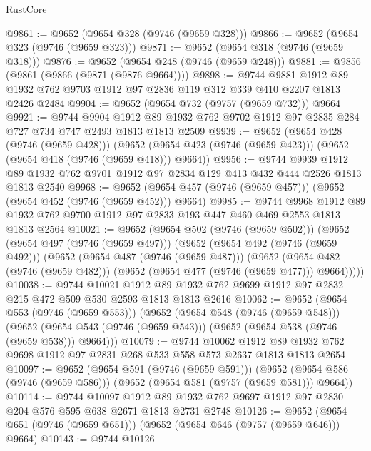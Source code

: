\begin{lexlean}{RustCore}
\begin{coremodule}
@9861 := @9652 (@9654 @328 (@9746 (@9659 @328)))
@9866 := @9652 (@9654 @323 (@9746 (@9659 @323)))
@9871 := @9652 (@9654 @318 (@9746 (@9659 @318)))
@9876 := @9652 (@9654 @248 (@9746 (@9659 @248)))
@9881 := @9856 (@9861 (@9866 (@9871 (@9876 @9664))))
@9898 := @9744
    @9881
    @1912
    @89
    @1932
    @762
    @9703
    @1912
    @97
    @2836
    @119
    @312
    @339
    @410
    @2207
    @1813
    @2426
    @2484
@9904 := @9652 (@9654 @732 (@9757 (@9659 @732))) @9664
@9921 := @9744
    @9904
    @1912
    @89
    @1932
    @762
    @9702
    @1912
    @97
    @2835
    @284
    @727
    @734
    @747
    @2493
    @1813
    @1813
    @2509
@9939 := @9652
    (@9654 @428 (@9746 (@9659 @428)))
    (@9652 (@9654 @423 (@9746 (@9659 @423))) (@9652 (@9654 @418 (@9746 (@9659 @418))) @9664))
@9956 := @9744
    @9939
    @1912
    @89
    @1932
    @762
    @9701
    @1912
    @97
    @2834
    @129
    @413
    @432
    @444
    @2526
    @1813
    @1813
    @2540
@9968 := @9652 (@9654 @457 (@9746 (@9659 @457))) (@9652 (@9654 @452 (@9746 (@9659 @452))) @9664)
@9985 := @9744
    @9968
    @1912
    @89
    @1932
    @762
    @9700
    @1912
    @97
    @2833
    @193
    @447
    @460
    @469
    @2553
    @1813
    @1813
    @2564
@10021 := @9652
    (@9654 @502 (@9746 (@9659 @502)))
    (@9652
      (@9654 @497 (@9746 (@9659 @497)))
      (@9652
        (@9654 @492 (@9746 (@9659 @492)))
        (@9652
          (@9654 @487 (@9746 (@9659 @487)))
          (@9652
            (@9654 @482 (@9746 (@9659 @482)))
            (@9652 (@9654 @477 (@9746 (@9659 @477))) @9664)))))
@10038 := @9744
    @10021
    @1912
    @89
    @1932
    @762
    @9699
    @1912
    @97
    @2832
    @215
    @472
    @509
    @530
    @2593
    @1813
    @1813
    @2616
@10062 := @9652
    (@9654 @553 (@9746 (@9659 @553)))
    (@9652
      (@9654 @548 (@9746 (@9659 @548)))
      (@9652 (@9654 @543 (@9746 (@9659 @543))) (@9652 (@9654 @538 (@9746 (@9659 @538))) @9664)))
@10079 := @9744
    @10062
    @1912
    @89
    @1932
    @762
    @9698
    @1912
    @97
    @2831
    @268
    @533
    @558
    @573
    @2637
    @1813
    @1813
    @2654
@10097 := @9652
    (@9654 @591 (@9746 (@9659 @591)))
    (@9652 (@9654 @586 (@9746 (@9659 @586))) (@9652 (@9654 @581 (@9757 (@9659 @581))) @9664))
@10114 := @9744
    @10097
    @1912
    @89
    @1932
    @762
    @9697
    @1912
    @97
    @2830
    @204
    @576
    @595
    @638
    @2671
    @1813
    @2731
    @2748
@10126 := @9652 (@9654 @651 (@9746 (@9659 @651))) (@9652 (@9654 @646 (@9757 (@9659 @646))) @9664)
@10143 := @9744
    @10126

\end{coremodule}
\end{lexlean}
